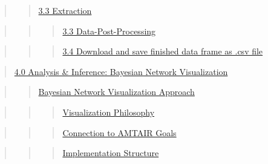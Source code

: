 \documentclass[
  11pt,
  letterpaper,
]{book}
\begin{document}
\begin{quote}
\begin{quote}
\hyperref[scrollTo=mv8f4c4D3yJj]{3.3 Extraction}
\end{quote}
\end{quote}

\begin{quote}
\begin{quote}
\begin{quote}
\hyperref[scrollTo=UcXf3fZ8dahj]{3.3 Data-Post-Processing}
\end{quote}
\end{quote}
\end{quote}

\begin{quote}
\begin{quote}
\begin{quote}
\hyperref[scrollTo=xTwPO_J-dahj]{3.4 Download and save finished data
frame as .csv file}
\end{quote}
\end{quote}
\end{quote}

\begin{quote}
\hyperref[scrollTo=t3zl7vKMECMg]{4.0 Analysis \& Inference: Bayesian
Network Visualization}
\end{quote}

\begin{quote}
\begin{quote}
\hyperref[scrollTo=t3zl7vKMECMg]{Bayesian Network Visualization
Approach}
\end{quote}
\end{quote}

\begin{quote}
\begin{quote}
\begin{quote}
\hyperref[scrollTo=t3zl7vKMECMg]{Visualization Philosophy}
\end{quote}
\end{quote}
\end{quote}

\begin{quote}
\begin{quote}
\begin{quote}
\hyperref[scrollTo=t3zl7vKMECMg]{Connection to AMTAIR Goals}
\end{quote}
\end{quote}
\end{quote}

\begin{quote}
\begin{quote}
\begin{quote}
\hyperref[scrollTo=t3zl7vKMECMg]{Implementation Structure}
\end{quote}
\end{quote}
\end{quote}
\end{document}
